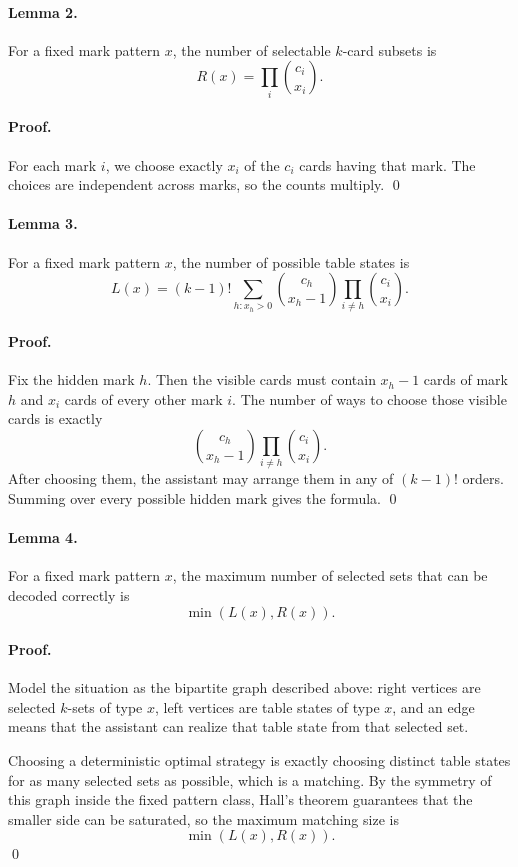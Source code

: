 \documentclass[11pt]{article}
\begin{document}
\paragraph{Lemma 2.}
For a fixed mark pattern $x$, the number of selectable $k$-card subsets is
\[
    R(x) = \prod_i \binom{c_i}{x_i}.
\]

\paragraph{Proof.}
For each mark $i$, we choose exactly $x_i$ of the $c_i$ cards having that mark. The choices are
independent across marks, so the counts multiply. \qed

\paragraph{Lemma 3.}
For a fixed mark pattern $x$, the number of possible table states is
\[
    L(x) = (k-1)! \sum_{h : x_h > 0}
    \binom{c_h}{x_h - 1} \prod_{i \ne h} \binom{c_i}{x_i}.
\]

\paragraph{Proof.}
Fix the hidden mark $h$. Then the visible cards must contain $x_h-1$ cards of mark $h$ and $x_i$ cards
of every other mark $i$. The number of ways to choose those visible cards is exactly
\[
    \binom{c_h}{x_h - 1} \prod_{i \ne h} \binom{c_i}{x_i}.
\]
After choosing them, the assistant may arrange them in any of $(k-1)!$ orders. Summing over every
possible hidden mark gives the formula. \qed

\paragraph{Lemma 4.}
For a fixed mark pattern $x$, the maximum number of selected sets that can be decoded correctly is
\[
    \min(L(x), R(x)).
\]

\paragraph{Proof.}
Model the situation as the bipartite graph described above: right vertices are selected $k$-sets of type
$x$, left vertices are table states of type $x$, and an edge means that the assistant can realize that
table state from that selected set.

Choosing a deterministic optimal strategy is exactly choosing distinct table states for as many selected
sets as possible, which is a matching. By the symmetry of this graph inside the fixed pattern class, Hall's
theorem guarantees that the smaller side can be saturated, so the maximum matching size is
\[
    \min(L(x), R(x)).
\]
\qed
\end{document}
